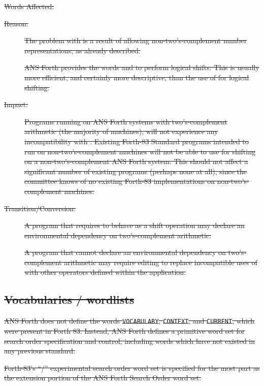 \begin{description}
\item[\sout{Words Affected:}]
\sout{}

\item[\sout{Reason:}]
\sout{%
	The problem with  is a result of allowing
	non-two's-complement number representations, as already
	described.}

\sout{%
	ANS Forth provides the words  and 
	to perform logical shifts. This is usually more efficient, and
	certainly more descriptive, than the use of  for
	logical shifting.}

\item[\sout{Impact:}]
\sout{%
	Programs running on ANS Forth systems with two's-complement
	arithmetic (the majority of machines), will not experience any
	incompatibility with . Existing Forth-83 Standard
	programs intended to run on non-two's-complement machines will
	not be able to use  for shifting on a
	non-two's-complement ANS Forth system. This should not affect
	a significant number of existing programs (perhaps none at all),
	since the committee knows of no existing Forth-83 implementations
	on non-two's-complement machines.}

\item[\sout{Transition/Conversion:}]
\sout{%
	A program that requires  to behave as a shift
	operation may declare an environmental dependency on
	two's-complement arithmetic.}

\sout{%
	A program that cannot declare an environmental dependency on
	two's-complement arithmetic may require editing to replace
	incompatible uses of  with other operators defined
	within the application.}
\end{description}

\subsection[Vocabularies / wordlists]{\sout{Vocabularies / wordlists}} %

\sout{%
ANS Forth does not define the words \texttt{VOCABULARY},
\texttt{CONTEXT}, and \texttt{CURRENT}, which were present in
Forth 83. Instead, ANS Forth defines a primitive word set for
search order specification and control, including words which have
not existed in any previous standard.}

\sout{%
Forth-83's ``/'' experimental
search order word set is specified for the most part as the extension
portion of the ANS Forth Search Order word set.}

